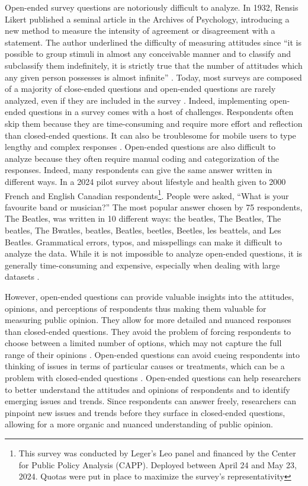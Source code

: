 \documentclass[
  authoryear,
  preprint,
  3p]{elsarticle}
\begin{document}
Open-ended survey questions are notoriously difficult to analyze. In
1932, Rensis Likert published a seminal article in the Archives of
Psychology, introducing a new method to measure the intensity of
agreement or disagreement with a statement. The author underlined the
difficulty of measuring attitudes since ``it is possible to group
stimuli in almost any conceivable manner and to classify and subclassify
them indefinitely, it is strictly true that the number of attitudes
which any given person possesses is almost infinite'' \citep{likert32}.
Today, most surveys are composed of a majority of close-ended questions
and open-ended questions are rarely analyzed, even if they are included
in the survey \citep{roberts_etal14}. Indeed, implementing open-ended
questions in a survey comes with a host of challenges. Respondents often
skip them because they are time-consuming and require more effort and
reflection than closed-ended questions. It can also be troublesome for
mobile users to type lengthy and complex responses
\citep{dillman_etal14}. Open-ended questions are also difficult to
analyze because they often require manual coding and categorization of
the responses. Indeed, many respondents can give the same answer written
in different ways. In a 2024 pilot survey about lifestyle and health
given to 2000 French and English Canadian respondents\footnote{This
  survey was conducted by Leger's Leo panel and financed by the Center
  for Public Policy Analysis (CAPP). Deployed between April 24 and May
  23, 2024. Quotas were put in place to maximize the survey's
  representativity}. People were asked, ``What is your favourite band or
musician?'' The most popular answer chosen by 75 respondents, The
Beatles, was written in 10 different ways: the beatles, The Beatles, The
beatles, The Bwatles, beatles, Beatles, beetles, Beetles, les beattels,
and Les Beatles. Grammatical errors, typos, and misspellings can make it
difficult to analyze the data. While it is not impossible to analyze
open-ended questions, it is generally time-consuming and expensive,
especially when dealing with large datasets
\citep{dillman_etal14, bradburn_etal04, roberts_etal14, schuman_presser96}.

However, open-ended questions can provide valuable insights into the
attitudes, opinions, and perceptions of respondents thus making them
valuable for measuring public opinion. They allow for more detailed and
nuanced responses than closed-ended questions. They avoid the problem of
forcing respondents to choose between a limited number of options, which
may not capture the full range of their opinions \citep{dillman_etal14}.
Open-ended questions can avoid cueing respondents into thinking of
issues in terms of particular causes or treatments, which can be a
problem with closed-ended questions \citep{roberts_etal14, iyengar96}.
Open-ended questions can help researchers to better understand the
attitudes and opinions of respondents and to identify emerging issues
and trends. Since respondents can answer freely, researchers can
pinpoint new issues and trends before they surface in closed-ended
questions, allowing for a more organic and nuanced understanding of
public opinion.
\end{document}
